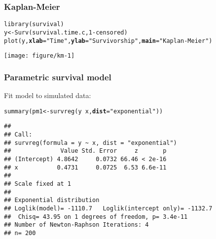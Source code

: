 \documentclass[color=usenames,dvipsnames]{beamer}\usepackage[]{graphicx}\usepackage[]{color}
\makeatletter
\newcommand{\hlnum}[1]{\textcolor[rgb]{0.69,0.494,0}{#1}}%
\newcommand{\hlstr}[1]{\textcolor[rgb]{0.749,0.012,0.012}{#1}}%
\newcommand{\hlopt}[1]{\textcolor[rgb]{0,0,0}{#1}}%
\newcommand{\hlstd}[1]{\textcolor[rgb]{0,0,0}{#1}}%
\newcommand{\hlkwb}[1]{\textcolor[rgb]{0,0.341,0.682}{#1}}%
\newcommand{\hlkwc}[1]{\textcolor[rgb]{0,0,0}{\textbf{#1}}}%
\newcommand{\hlkwd}[1]{\textcolor[rgb]{0.004,0.004,0.506}{#1}}%
\newenvironment{kframe}{%
 \def\at@end@of@kframe{}%
 \ifinner\ifhmode%
  \def\at@end@of@kframe{\end{minipage}}%
  \begin{minipage}{\columnwidth}%
 \fi\fi%
 \def\FrameCommand##1{\hskip\@totalleftmargin \hskip-\fboxsep
 \colorbox{shadecolor}{##1}\hskip-\fboxsep
     \hskip-\linewidth \hskip-\@totalleftmargin \hskip\columnwidth}%
 \MakeFramed {\advance\hsize-\width
   \@totalleftmargin\z@ \linewidth\hsize
   \@setminipage}}%
 {\par\unskip\endMakeFramed%
 \at@end@of@kframe}
\newenvironment{knitrout}{}{} %
\makeatother
\begin{document}
\begin{frame}[fragile]
  \frametitle{Kaplan-Meier}
\begin{knitrout}\footnotesize
{}\color{fgcolor}\begin{kframe}
\begin{alltt}
\hlkwd{library}\hlstd{(survival)}
\hlstd{y} \hlkwb{<-} \hlkwd{Surv}\hlstd{(survival.time.c,} \hlnum{1}\hlopt{-}\hlstd{censored)}
\hlkwd{plot}\hlstd{(y,} \hlkwc{xlab}\hlstd{=}\hlstr{"Time"}\hlstd{,} \hlkwc{ylab}\hlstd{=}\hlstr{"Survivorship"}\hlstd{,} \hlkwc{main}\hlstd{=}\hlstr{"Kaplan-Meier"}\hlstd{)}
\end{alltt}
\end{kframe}

{\centering \texttt{[image: figure/km-1]} 

}


\end{knitrout}
\end{frame}





\begin{frame}[fragile]
  \frametitle{Parametric survival model}
  Fit model to simulated data:
\begin{knitrout}\scriptsize
{}\color{fgcolor}\begin{kframe}
\begin{alltt}
\hlkwd{summary}\hlstd{(pm1} \hlkwb{<-} \hlkwd{survreg}\hlstd{(y} \hlopt{~} \hlstd{x,} \hlkwc{dist}\hlstd{=}\hlstr{"exponential"}\hlstd{))}
\end{alltt}
\begin{verbatim}
## 
## Call:
## survreg(formula = y ~ x, dist = "exponential")
##              Value Std. Error     z       p
## (Intercept) 4.8642     0.0732 66.46 < 2e-16
## x           0.4731     0.0725  6.53 6.6e-11
## 
## Scale fixed at 1 
## 
## Exponential distribution
## Loglik(model)= -1110.7   Loglik(intercept only)= -1132.7
## 	Chisq= 43.95 on 1 degrees of freedom, p= 3.4e-11 
## Number of Newton-Raphson Iterations: 4 
## n= 200
\end{verbatim}
\end{kframe}
\end{knitrout}
\end{frame}
\end{document}
